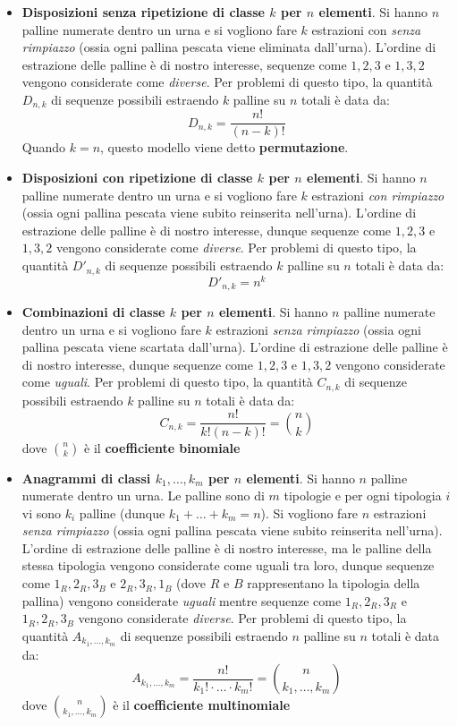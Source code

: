 \documentclass[a4paper, 12pt]{report}
\begin{document}
    \begin{itemize}
        \item \textbf{Disposizioni senza ripetizione di classe $k$ per $n$ elementi}. Si hanno $n$ palline numerate dentro un urna e si vogliono fare \(k\) estrazioni con \textit{senza rimpiazzo} (ossia ogni pallina pescata viene eliminata dall'urna). L'ordine di estrazione delle palline è di nostro interesse, sequenze come $1,2,3$ e $1,3,2$ vengono considerate come \textit{diverse}. Per problemi di questo tipo, la quantità $D_{n,k}$ di sequenze possibili estraendo $k$ palline su $n$ totali è data da:
        \[D_{n,k} = \frac{n!}{(n-k)!}\]
        Quando $k =n$, questo modello viene detto \textbf{permutazione}.
        \item \textbf{Disposizioni con ripetizione di classe $k$ per $n$ elementi}. Si hanno $n$ palline numerate dentro un urna e si vogliono fare \(k\) estrazioni \textit{con rimpiazzo} (ossia ogni pallina pescata viene subito reinserita nell'urna). L'ordine di estrazione delle palline è di nostro interesse, dunque sequenze come $1,2,3$ e $1,3,2$ vengono considerate come \textit{diverse}. Per problemi di questo tipo, la quantità $D'_{n,k}$ di sequenze possibili estraendo $k$ palline su $n$ totali è data da:
        \[D'_{n,k} = n^k\]
        \item \textbf{Combinazioni di classe $k$ per $n$ elementi}. Si hanno $n$ palline numerate dentro un urna e si vogliono fare \(k\) estrazioni \textit{senza rimpiazzo} (ossia ogni pallina pescata viene scartata dall'urna). L'ordine di estrazione delle palline è di nostro interesse, dunque sequenze come $1,2,3$ e $1,3,2$ vengono considerate come \textit{uguali}. Per problemi di questo tipo, la quantità $C_{n,k}$ di sequenze possibili estraendo $k$ palline su $n$ totali è data da:
        \[C_{n,k} = \frac{n!}{k! (n-k)!} = \binom{n}{k}\]
        dove $\binom{n}{k}$ è il \textbf{coefficiente binomiale}
        \item \textbf{Anagrammi di classi $k_1, \ldots, k_m$ per $n$ elementi}. Si hanno $n$ palline numerate dentro un urna. Le palline sono di $m$ tipologie e per ogni tipologia $i$ vi sono $k_i$ palline (dunque $k_1 + \ldots + k_m = n$). Si vogliono fare $n$ estrazioni \textit{senza rimpiazzo} (ossia ogni pallina pescata viene subito reinserita nell'urna). L'ordine di estrazione delle palline è di nostro interesse, ma le palline della stessa tipologia vengono considerate come uguali tra loro, dunque sequenze come $1_R, 2_R, 3_B$ e $2_R, 3_R, 1_B$ (dove $R$ e $B$ rappresentano la tipologia della pallina) vengono considerate \textit{uguali} mentre sequenze come $1_R, 2_R, 3_R$ e $1_R, 2_R, 3_B$ vengono considerate \textit{diverse}. Per problemi di questo tipo, la quantità $A_{k_1, \ldots, k_m}$ di sequenze possibili estraendo $n$ palline su $n$ totali è data da:
        \[A_{k_1, \ldots, k_m} = \frac{n!}{k_1! \cdot \ldots \cdot k_m !} = \binom{n}{k_1, \ldots, k_m}\]
        dove $\binom{n}{k_1, \ldots, k_m}$ è il \textbf{coefficiente multinomiale} 
    \end{itemize}
\end{document}
